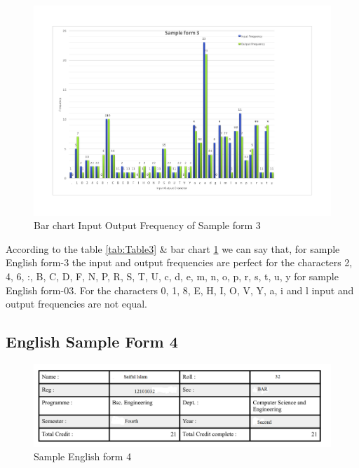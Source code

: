 \begin{figure}[H]
\centering
\includegraphics[width=1\textwidth]{form3.pdf}
\caption {Bar chart Input Output Frequency of Sample form 3}
\label {fig:bar3}
\end{figure}
According to the table \ref{tab:Table3} \& bar chart \ref{fig:bar3} we can say that, for sample English form-3 the input and output frequencies are perfect for the characters 2, 4, 6, :, B, C, D, F, N, P, R, S, T, U, c, d, e, m, n, o, p, r, s, t, u, y for sample English form-03. For the characters 0, 1, 8, E, H, I, O, V, Y, a, i and l input and output frequencies are not equal. 

\subsection{English Sample Form 4}

\begin{figure}[H]
\centering
\includegraphics[width=1\textwidth]{form4.png}
\caption {Sample English form 4}
\label {fig:form4}
\end{figure}

